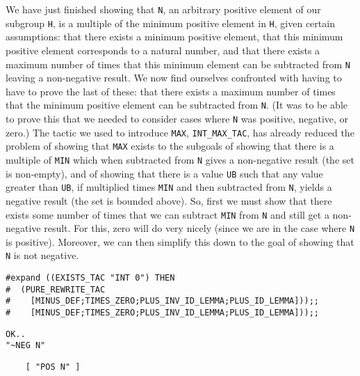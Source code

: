 We have just finished showing that {\small\tt N}, an arbitrary
positive element of our subgroup {\small\tt H}, is a multiple of the
minimum positive element in {\small\tt H}, given certain assumptions:
that there exists a minimum positive element, that this minimum
positive element corresponds to a natural number, and that there
exists a maximum number of times that this minimum element can be
subtracted from {\small\tt N} leaving a non-negative result.  We now
find ourselves confronted with having to have to prove the last of
these: that there exists a maximum number of times that the minimum
positive element can be subtracted from {\small\tt N}.  (It was to be
able to prove this that we needed to consider cases where {\small\tt N}
was positive, negative, or zero.)  The tactic we used to introduce
{\small\verb+MAX+}, {\small\verb+INT_MAX_TAC+}, has already reduced
the problem of showing that {\small\verb+MAX+} exists to the subgoals
of showing that there is a multiple of {\small\verb+MIN+} which when
subtracted from {\small\tt N} gives a non-negative result (the set is
non-empty), and of showing that there is a value {\small\verb+UB+}
such that any value greater than {\small\verb+UB+}, if multiplied
times {\small\verb+MIN+} and then subtracted from {\small\tt N},
yields a negative result (the set is bounded above).  So, first we
must show that there exists some number of times that we can subtract
{\small\verb+MIN+} from {\small\tt N} and still get a non-negative
result.  For this, zero will do very nicely (since we are in the case
where {\small\tt N} is positive).  Moreover, we can then simplify this
down to the goal of showing that {\small\tt N} is not negative.

\newpage %

\begin{session}
\begin{verbatim}
#expand ((EXISTS_TAC "INT 0") THEN 
#  (PURE_REWRITE_TAC
#    [MINUS_DEF;TIMES_ZERO;PLUS_INV_ID_LEMMA;PLUS_ID_LEMMA]));;
#    [MINUS_DEF;TIMES_ZERO;PLUS_INV_ID_LEMMA;PLUS_ID_LEMMA]));;
\end{verbatim}
\mvdots
\begin{verbatim}
OK..
"~NEG N"
\end{verbatim}
\mvdots
\begin{verbatim}
    [ "POS N" ]
\end{verbatim}
\evdots
\end{session}

